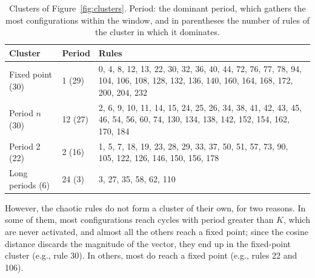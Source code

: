 \begin{table}[!ht]
\centering
\setlength{\tabcolsep}{4pt}
\begin{tabular}{p{} p{} p{}}
\hline
Cluster & Period & Rules \\
\hline
Fixed point (30) & 1 (29) & 0, 4, 8, 12, 13, 22, 30, 32, 36, 40, 44, 72, 76, 77, 78, 94, 104, 106, 108, 128, 132, 136, 140, 160, 164, 168, 172, 200, 204, 232 \\
Period $n$ (30) & 12 (27) & 2, 6, 9, 10, 11, 14, 15, 24, 25, 26, 34, 38, 41, 42, 43, 45, 46, 54, 56, 60, 74, 130, 134, 138, 142, 152, 154, 162, 170, 184 \\
Period 2 (22) & 2 (16) & 1, 5, 7, 18, 19, 23, 28, 29, 33, 37, 50, 51, 57, 73, 90, 105, 122, 126, 146, 150, 156, 178 \\
Long periods (6) & 24 (3) & 3, 27, 35, 58, 62, 110 \\
\hline
\end{tabular}
\caption{Clusters of Figure~\ref{fig:clusters}. Period: the dominant period, which gathers the most configurations within the window, and in parentheses the number of rules of the cluster in which it dominates.}
\label{tab:clusters}
\end{table}

However, the chaotic rules do not form a cluster of their own, for two reasons. In some of them, most configurations reach cycles with period greater than $K$, which are never activated, and almost all the others reach a fixed point; since the cosine distance discards the magnitude of the vector, they end up in the fixed-point cluster (e.g., rule 30). In others, most do reach a fixed point (e.g., rules 22 and 106).
